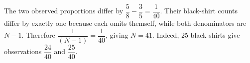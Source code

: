 The two observed proportions differ by $\dfrac{5}{8}-\dfrac{3}{5}=\dfrac{1}{40}$. Their black-shirt counts differ by exactly one because each omits themself, while both denominators are $N-1$. Therefore $\dfrac{1}{(N-1)}=\dfrac{1}{40}$, giving $\boxed{N=41}$. Indeed, 25 black shirts give observations $\dfrac{24}{40}$ and $\dfrac{25}{40}$.
